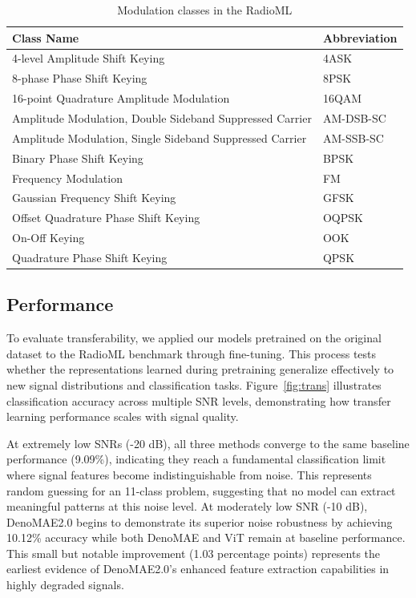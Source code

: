 \begin{table}[h]
    \centering
    \caption{Modulation classes in the RadioML}
    \small
    \begin{tabular}{p{5cm}l}
        \hline
        \textbf{Class Name} & \textbf{Abbreviation} \\ \hline
        4-level Amplitude Shift Keying & 4ASK \\ 
        8-phase Phase Shift Keying & 8PSK \\ 
        16-point Quadrature Amplitude Modulation & 16QAM \\ 
        Amplitude Modulation, Double Sideband Suppressed Carrier & AM-DSB-SC \\ 
        Amplitude Modulation, Single Sideband Suppressed Carrier & AM-SSB-SC \\ 
        Binary Phase Shift Keying & BPSK \\ 
        Frequency Modulation & FM \\ 
        Gaussian Frequency Shift Keying & GFSK \\ 
        Offset Quadrature Phase Shift Keying & OQPSK \\ 
        On-Off Keying & OOK \\ 
        Quadrature Phase Shift Keying & QPSK \\ \hline
    \end{tabular}
    \label{tab:radioml_classes_compact}
\end{table}

\subsection{Performance}

To evaluate transferability, we applied our models pretrained on the original dataset to the RadioML benchmark through fine-tuning. This process tests whether the representations learned during pretraining generalize effectively to new signal distributions and classification tasks. Figure~\ref{fig:trans} illustrates classification accuracy across multiple SNR levels, demonstrating how transfer learning performance scales with signal quality.

At extremely low SNRs (-20 dB), all three methods converge to the same baseline performance (9.09\%), indicating they reach a fundamental classification limit where signal features become indistinguishable from noise. This represents random guessing for an 11-class problem, suggesting that no model can extract meaningful patterns at this noise level. At moderately low SNR (-10 dB), DenoMAE2.0 begins to demonstrate its superior noise robustness by achieving 10.12\% accuracy while both DenoMAE and ViT remain at baseline performance. This small but notable improvement (1.03 percentage points) represents the earliest evidence of DenoMAE2.0's enhanced feature extraction capabilities in highly degraded signals.


